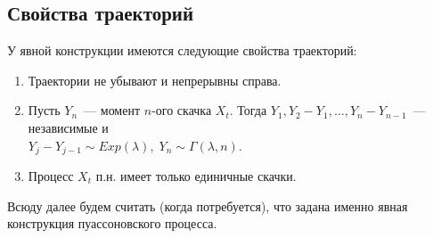 \subsection{Свойства траекторий}

\begin{statement}
     У явной конструкции имеются следующие свойства траекторий:

    \begin{enumerate}
        \item Траектории не убывают и непрерывны справа.
        \item Пусть $Y_n$~--- момент $n$-ого скачка $X_t$. Тогда $Y_1, Y_2 - Y_1, \ldots, Y_n - Y_{n-1}$~--- независимые и\\ $Y_j - Y_{j-1} \sim Exp(\lambda), \; Y_n \sim \Gamma(\lambda, n)$.
        \item Процесс $X_t$ п.н. имеет только единичные скачки.
    \end{enumerate}
\end{statement}

\begin{note} 
    Всюду далее будем считать (когда потребуется), что задана именно явная конструкция пуассоновского процесса.
\end{note}
